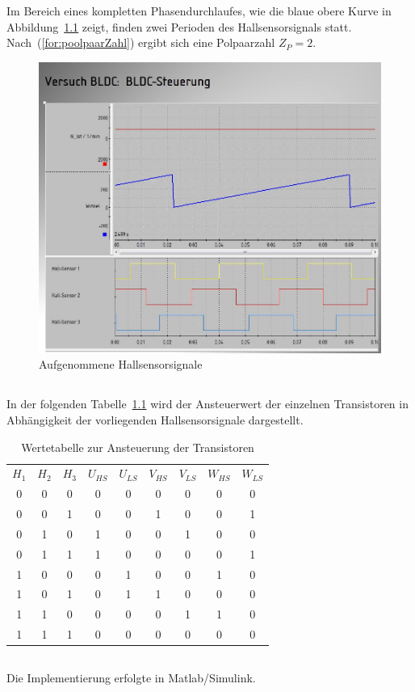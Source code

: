 \chapter{}\label{ex:aufg4}
%
\section{}\label{sec:aufg4a}
Im Bereich eines kompletten Phasendurchlaufes, wie die blaue obere Kurve in Abbildung~\ref{fig:aufgenommen_hallSensorSig} zeigt, finden zwei Perioden des Hallsensorsignals statt. Nach~(\ref{for:poolpaarZahl}) ergibt sich eine Polpaarzahl $Z_P = 2$.
\begin{figure}[htb]
	\includegraphics[width = \textwidth]{./Bilder/bldc_aufgenommenSig}
	\caption{Aufgenommene Hallsensorsignale}
	\label{fig:aufgenommen_hallSensorSig}
\end{figure}
\newpage
\section{}\label{sec:aufg4b}
In der folgenden Tabelle~\ref{tab:T_Ansteuerung} wird der Ansteuerwert der einzelnen Transistoren in Abhängigkeit der vorliegenden Hallsensorsignale dargestellt.

\begin{table}[htb]
	\centering
\begin{tabular}{ccc||cccccc}
	$H_1$ & $H_2$ & $H_3$ & $U_{HS}$ & $U_{LS}$ & $V_{HS}$ & $V_{LS}$ & $W_{HS}$ & $W_{LS}$ \\ 
	0&0&0&0&0&0&0&0&0\\
	0&0&1&0&0&1&0&0&1\\
	0&1&0&1&0&0&1&0&0\\
	0&1&1&1&0&0&0&0&1\\
	1&0&0&0&1&0&0&1&0\\
	1&0&1&0&1&1&0&0&0\\
	1&1&0&0&0&0&1&1&0\\
	1&1&1&0&0&0&0&0&0
\end{tabular}  
\caption{Wertetabelle zur Ansteuerung der Transistoren}
\label{tab:T_Ansteuerung}
\end{table}
%
\section{}\label{sec:aufg4c}
%
Die Implementierung erfolgte in Matlab/Simulink.